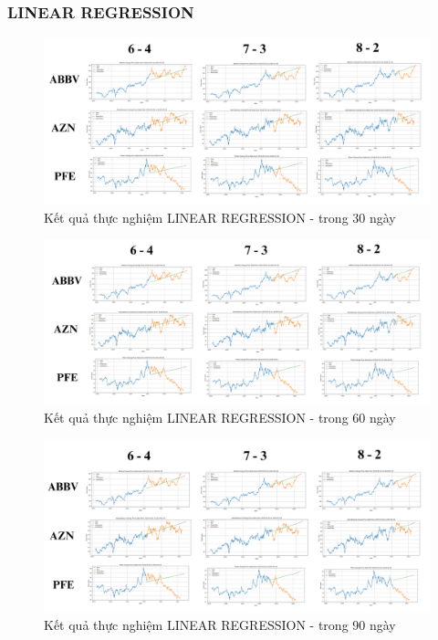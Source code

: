 \documentclass[conference]{IEEEtran}
\begin{document}
\subsubsection{LINEAR REGRESSION}
\vspace{-15pt}
\begin{figure}[H]
    \centering
    \begin{minipage}{0.5\textwidth}
    \centering
    \includegraphics[width=1\textwidth]{Image/LR30.png}
    \caption{Kết quả thực nghiệm LINEAR REGRESSION - trong 30 ngày}
    \label{fig:1}
    \end{minipage}
\end{figure}
\begin{figure}[H]
    \centering
    \begin{minipage}{0.5\textwidth}
    \centering
    \includegraphics[width=1\textwidth]{Image/LR60.png}
    \caption{Kết quả thực nghiệm LINEAR REGRESSION - trong 60 ngày}
    \label{fig:1}
    \end{minipage}
\end{figure}
\begin{figure}[H]
    \centering
    \begin{minipage}{0.5\textwidth}
    \centering
    \includegraphics[width=1\textwidth]{Image/LR90.png}
    \caption{Kết quả thực nghiệm LINEAR REGRESSION - trong 90 ngày}
    \label{fig:1}
    \end{minipage}
\end{figure}
\end{document}
